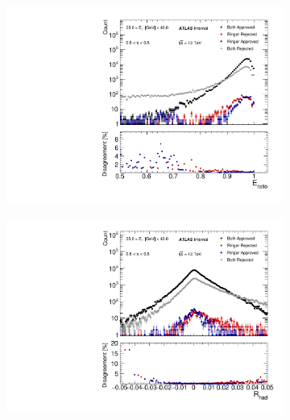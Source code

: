 \begin{figure}[h!]
\begin{subfigure}[c]{.49\textwidth}
\centering
\includegraphics[width=\textwidth]{sections/analyses/figures/quadrant_plots/HLT_e28_lhtight_nod0_noringer_ivarloose_HLT_e28_lhtight_nod0_ivarloose_eratio_et4_eta1.pdf}
\caption{}
\end{subfigure}
\hfill
\begin{subfigure}[c]{.49\textwidth}
\centering
\includegraphics[width=\textwidth]{sections/analyses/figures/quadrant_plots/HLT_e28_lhtight_nod0_noringer_ivarloose_HLT_e28_lhtight_nod0_ivarloose_rhad_et4_eta1.pdf}
\caption{}
\end{subfigure} \\



\end{figure}
